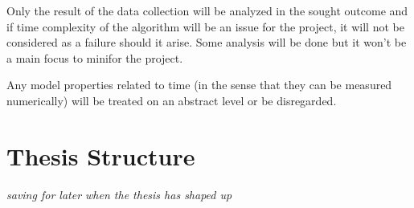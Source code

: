 Only the result of the data collection will be analyzed in the sought outcome and if time complexity of the algorithm will be an issue for the project, it will not be considered as a failure should it arise. Some analysis will be done but it won't be a main focus to minifor the project.

Any model properties related to time (in the sense that they can be measured numerically) will be treated on an abstract level or be disregarded. %





\section{Thesis Structure}

\textit{saving for later when the thesis has shaped up}

